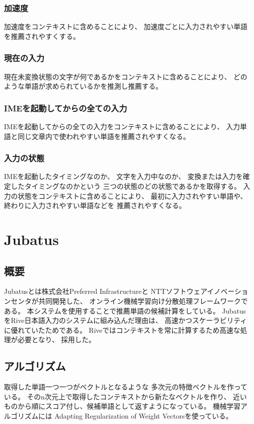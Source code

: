 \subsubsection{加速度}
加速度をコンテキストに含めることにより、
加速度ごとに入力されやすい単語を推薦されやすくする。

\subsubsection{現在の入力}
現在未変換状態の文字が何であるかをコンテキストに含めることにより、
どのような単語が求められているかを推測し推薦する。

\subsubsection{IMEを起動してからの全ての入力}
IMEを起動してからの全ての入力をコンテキストに含めることにより、
入力単語と同じ文章内で使われやすい単語を推薦されやすくなる。

\subsubsection{入力の状態}
IMEを起動したタイミングなのか、
文字を入力中なのか、
変換または入力を確定したタイミングなのかという
三つの状態のどの状態であるかを取得する。
入力の状態をコンテキストに含めることにより、
最初に入力されやすい単語や、終わりに入力されやすい単語などを
推薦されやすくなる。

\section{Jubatus}
\label{sec:jubatus}

\subsection{概要}
Jubatus\cite{jubatus}とは株式会社Preferred Infrastructureと
NTTソフトウェアイノベーションセンタが共同開発した、
オンライン機械学習向け分散処理フレームワークである。
本システムを使用することで推薦単語の候補計算をしている。
JubatusをRive日本語入力のシステムに組み込んだ理由は、
高速かつスケーラビリティに優れていたためである。
\cite{岡野原大輔:2013-01-01}
Riveではコンテキストを常に計算するため高速な処理が必要となり、
採用した。

\subsection{アルゴリズム}
取得した単語一つ一つがベクトルとなるような
多次元の特徴ベクトルを作っている。
そのn次元上で取得したコンテキストから新たなベクトルを作り、
近いものから順にスコア付し、候補単語として返すようになっている。
機械学習アルゴリズムには
Adapting Regularization of Weight Vectors\cite{AROW}を使っている。

